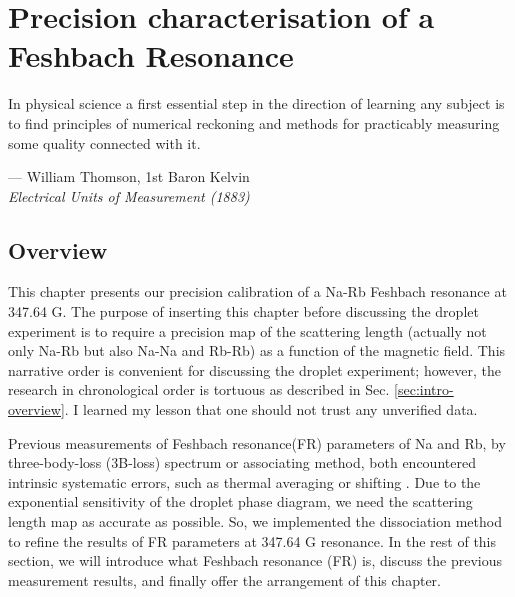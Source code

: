 \chapter{Precision characterisation of a Feshbach Resonance}
\label{Chap_Feshbach}

\setlength{\unitlength}{1pt}
\setlength{\epigraphwidth}{11.5cm}
\epigraph{In physical science a first essential step in the direction of learning any subject is to find principles of numerical reckoning and methods for practicably measuring some quality connected with it. \cite{thomson_2011}}{--- William Thomson, 1st Baron Kelvin \\ \textit{Electrical Units of Measurement (1883)}}

\section{Overview}
This chapter presents our precision calibration of a Na-Rb Feshbach resonance at 347.64 G. The purpose of inserting this chapter before discussing the droplet experiment is to require a precision map of the scattering length (actually not only Na-Rb but also Na-Na and Rb-Rb) as a function of the magnetic field. This narrative order is convenient for discussing the droplet experiment; however, the research in chronological order is tortuous as described in Sec. \ref{sec:intro-overview}. I learned my lesson that one should not trust any unverified data.

Previous measurements of Feshbach resonance(FR) parameters of Na and Rb, by three-body-loss (3B-loss) spectrum or associating method, both encountered intrinsic systematic errors, such as thermal averaging or shifting \cite{Bartenstein2005, Zurn2013}. Due to the exponential sensitivity of the droplet phase diagram, we need the scattering length map as accurate as possible. So, we implemented the dissociation method to refine the results of FR parameters at 347.64 G resonance. In the rest of this section, we will introduce what Feshbach resonance (FR) is, discuss the previous measurement results, and finally offer the arrangement of this chapter.

